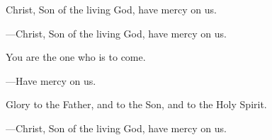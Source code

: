 \responsory

\begin{hangpar}
Christ, Son of the living God, have mercy on us.

{\color{red}---\thinspace }Christ, Son of the living God, have mercy on us.

\medskip You are the one who is to come.

{\color{red}---\thinspace }Have mercy on us.

\medskip Glory to the Father, and to the Son, and to the Holy Spirit.

{\color{red}---\thinspace }Christ, Son of the living God, have mercy on us.
\end{hangpar}
